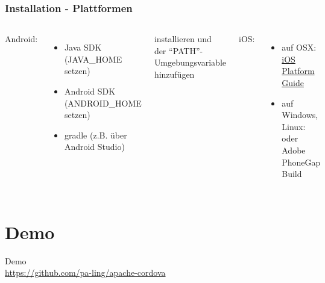 \documentclass[xcolor=dvipsnames]{beamer}
\begin{document}
\begin{frame}\frametitle{Installation - Plattformen}
	\begin{columns}[t,onlytextwidth]
			Android:
			\begin{itemize}
				\item Java SDK (JAVA\_HOME setzen)
				\item Android SDK (ANDROID\_HOME setzen)
				\item gradle (z.B. über Android Studio)
			\end{itemize}
			installieren und der "`PATH"'-Umgebungsvariable hinzufügen\newline
			
			iOS:
			\begin{itemize}
				\item auf OSX: \href{https://cordova.apache.org/docs/en/latest/guide/platforms/ios/index.html}{\textcolor{cordovablue}{iOS Platform Guide}}
				\item auf Windows, Linux: {\LARGE \frownie} oder Adobe PhoneGap Build
			\end{itemize}
		\centering
		\includegraphics[width=0.9\textwidth,valign=t]{pictures/cordova_device_is_ready}
	\end{columns}
\end{frame}

\section{Demo}
\begin{frame}
	\centering
	{\LARGE \textcolor{cordovablue}{Demo}}\\
	\vspace{4ex}
	\href{https://github.com/pa-ling/apache-cordova}{https://github.com/pa-ling/apache-cordova}
\end{frame}
\end{document}
